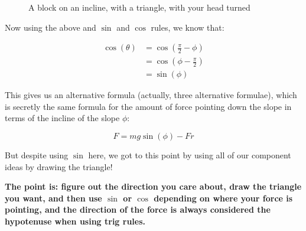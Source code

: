 \begin{figure}[H]
    \centering
    \caption{A block on an incline, with a triangle, with your head turned}
    \label{fig:block-incline-basic-rotated-triangle}
\end{figure}

Now using the above and $\sin$ and $\cos$ rules, we know that:

\begin{align*}
    \cos(\theta) &= \cos(\frac{\pi}{2} - \phi) \\
     &= \cos(\phi - \frac{\pi}{2} ) \\
     &= \sin(\phi)
\end{align*}

This gives us an alternative formula (actually, three alternative formulae), which is secretly the same formula for the amount of force pointing down the slope in terms of the incline of the slope $\phi$:

\[ F = mg \sin (\phi) - Fr\]

But despite using $\sin$ here, we got to this point by using all of our component ideas by drawing the triangle!

\textbf{The point is: figure out the direction you care about, draw the triangle you want, and then use $\sin$ or $\cos$ depending on where your force is pointing, and the direction of the force is always considered the hypotenuse when using trig rules.}

